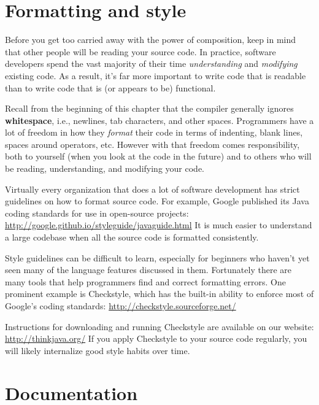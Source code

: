 \section{Formatting and style}


Before you get too carried away with the power of composition, keep in mind that other people will be reading your source code.
In practice, software developers spend the vast majority of their time {\em understanding} and {\em modifying} existing code.
As a result, it's far more important to write code that is readable than to write code that is (or appears to be) functional.


Recall from the beginning of this chapter that the compiler generally ignores {\bf whitespace}, i.e., newlines, tab characters, and other spaces.
Programmers have a lot of freedom in how they {\em format} their code in terms of indenting, blank lines, spaces around operators, etc.
However with that freedom comes responsibility, both to yourself (when you look at the code in the future) and to others who will be reading, understanding, and modifying your code.

Virtually every organization that does a lot of software development has strict guidelines on how to format source code.
For example, Google published its Java coding standards for use in open-source projects:
\url{http://google.github.io/styleguide/javaguide.html}
It is much easier to understand a large codebase when all the source code is formatted consistently.

Style guidelines can be difficult to learn, especially for beginners who haven't yet seen many of the language features discussed in them.
Fortunately there are many tools that help programmers find and correct formatting errors.
One prominent example is Checkstyle, which has the built-in ability to enforce most of Google's coding standards:
\url{http://checkstyle.sourceforge.net/}

Instructions for downloading and running Checkstyle are available on our website: \url{http://thinkjava.org/}
If you apply Checkstyle to your source code regularly, you will likely internalize good style habits over time.


\section{Documentation}

